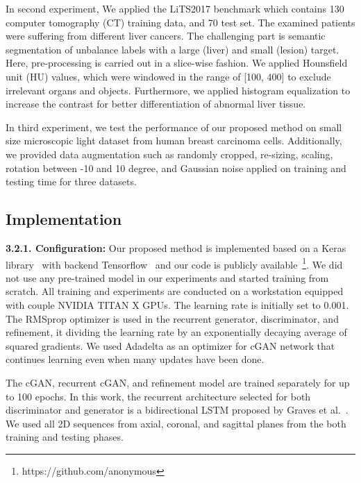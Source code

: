 \documentclass[10pt,twocolumn,letterpaper]{article}
\begin{document}
In second experiment, We applied the LiTS2017 benchmark which contains 130 computer tomography (CT) training data, and 70 test set. The examined patients were suffering from different liver cancers. The challenging part is semantic segmentation of unbalance labels with a large (liver) and small (lesion) target. Here, pre-processing is carried out in a slice-wise fashion. We applied Hounsfield unit (HU) values, which were windowed in the range of [100, 400] to exclude irrelevant organs and objects. Furthermore, we applied histogram equalization to increase the contrast for better differentiation of abnormal liver tissue.

In third experiment, we test the performance of our proposed method on small size microscopic light dataset from human breast carcinoma cells. %
Additionally, we provided data augmentation such as randomly cropped, re-sizing, scaling, rotation between -10 and 10 degree, and Gaussian noise applied on training and testing time for three datasets.

\subsection{Implementation}\textbf{3.2.1. Configuration:} Our proposed method is implemented based on a Keras library~\cite{chollet2015keras} with backend Tensorflow~\cite{abadi2016tensorflow} and our code is publicly available~\footnote{https://github.com/anonymous}. We did not use any pre-trained model in our experiments and started training from scratch. All training and experiments are conducted on a workstation equipped with couple NVIDIA TITAN X GPUs. The learning rate is initially set to 0.001. The RMSprop optimizer is used in the recurrent generator, discriminator, and refinement, it dividing the learning rate by an exponentially decaying average of squared gradients. We used Adadelta as an optimizer for cGAN network that continues learning even when many updates have been done.

The cGAN, recurrent cGAN, and refinement model are trained separately for up to 100 epochs. In this work, the recurrent architecture selected for both discriminator and generator is a bidirectional LSTM proposed by Graves et al.~\cite{graves2005framewise}. We used all 2D sequences from axial, coronal, and sagittal planes from the both training and testing phases.
\end{document}
